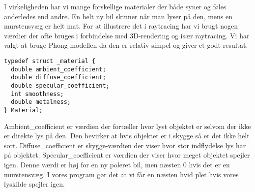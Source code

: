 I virkeligheden har vi mange forskellige materialer der både syner og føles anderledes end andre. En helt ny bil skinner når man lyser på den, mens en murstensvæg er helt mat. For at illustrere det i raytracing har vi brugt nogen værdier der ofte bruges i forbindelse med 3D-rendering og især raytracing. Vi har valgt at bruge Phong-modellen da den er relativ simpel og giver et godt resultat.

\begin{lstlisting}[style=Cstyle, caption=Typedefinition af Material]
typedef struct _material {
  double ambient_coefficient;
  double diffuse_coefficient;
  double specular_coefficient;
  int smoothness;
  double metalness; 
} Material;
\end{lstlisting}

Ambient_coefficient er værdien der fortæller hvor lyst objektet er selvom der ikke er direkte lys på den. Den bevirker at hvis objektet er i skygge så er det ikke helt sort.
Diffuse_coefficient er skygge-værdien der viser hvor stor indflydelse lys har på objektet. 
Specular_coefficient er værdien der viser hvor meget objektet spejler igen. Denne værdi er høj for en ny poleret bil, men næsten 0 hvis det er en murstensvæg. I vores program gør det at vi får en næsten hvid plet hvis vores lyskilde spejler igen.